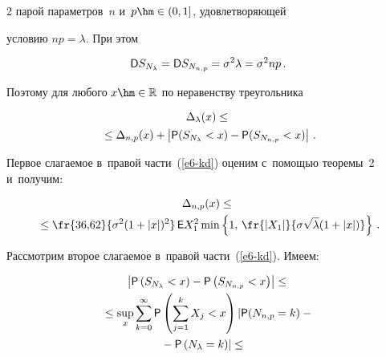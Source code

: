 \begin{multicols}{2}
парой параметров~$n$ и~$p\hm\in(0,1]$, удовлетворяющей


условию $np=\lambda$. При этом


$$


{\sf D}S_{N_{\lambda}}={\sf D}S_{N_{n,p}}=\sigma^2\lambda=\sigma^2np\,.


$$


Поэтому для любого $x\hm\in\mathbb{R}$ по неравенству треугольника


\begin{multline}


\Delta_{\lambda}(x)\le{}\\


{}\le\Delta_{n,p}(x)+


\left\vert {\sf P}(S_{N_{\lambda}}<x)-{\sf P}(S_{N_{n,p}}<x)\right\vert\,.


\label{e6-kd}


\end{multline}


Первое слагаемое в~правой части~(\ref{e6-kd}) оценим с~помощью теоремы~2 и~получим:


\begin{multline}


\Delta_{n,p}(x)\le{}\\


{}\le \fr{36{,}62}{\sigma^2(1+|x|)^2}\, {\sf E}X_1^2\min


\left\{1,\,\fr{|X_1|}{\sigma\sqrt{\lambda}(1+|x|)}\right\}\,.


\label{e7-kd}


\end{multline}


Рассмотрим второе слагаемое в~правой части~(\ref{e6-kd}). Имеем:


\begin{multline}


\left\vert {\sf P}\left(S_{N_{\lambda}}<x\right)-{\sf P}


\left(S_{N_{n,p}}<x\right)\right\vert \le{}\\


{}\le\sup\limits_x


\sum\limits_{k=0}^{\infty}{\sf P}


\left(\sum\limits_{j=1}^kX_j<x\right)\left\vert 


{\sf P}(N_{n,p}=k)-{}\right.\\


\hspace*{-4.5mm}\left.{}-{\sf P}\left(N_{\lambda}=k\right)\right\vert \le



\end{multline}
\end{multicols}
